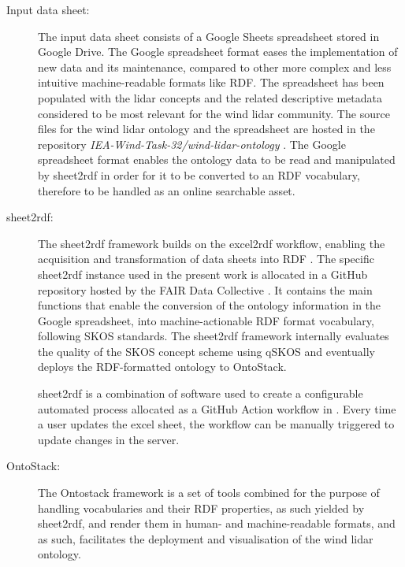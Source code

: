 \documentclass[remotesensing,article,submit,pdftex,moreauthors]{Definitions/mdpi}
\begin{document}
\begin{description}
    
    \item [Input data sheet:] The input data sheet consists of a Google Sheets spreadsheet stored in Google Drive. The Google spreadsheet format eases the implementation of new data and its maintenance, compared to other more complex and less intuitive machine-readable formats like RDF. The spreadsheet has been populated with the lidar concepts and the related descriptive metadata considered to be most relevant for the wind lidar community. The source files for the wind lidar ontology and the spreadsheet are hosted in the repository  \textit{IEA-Wind-Task-32/wind-lidar-ontology} \cite{ref-IEA-Wind-Task-32-wind-lidar-ontology}.
    The Google spreadsheet format enables the ontology data to be read and manipulated by sheet2rdf in order for it to be converted to an RDF vocabulary, therefore to be handled as an online searchable asset. 
    
    \item [sheet2rdf:] The sheet2rdf framework builds on the excel2rdf \cite{ref-excel2rdf} workflow, enabling the acquisition and transformation of data sheets into RDF \cite{ref-sheet2rdf}. The specific sheet2rdf instance used in the present work is allocated in a GitHub repository \cite{ref-FAIRsheet2rdf} hosted by the FAIR Data Collective \cite{}. It contains the main functions that enable the conversion of the ontology information in the Google spreadsheet, into machine-actionable RDF format vocabulary, following SKOS standards. The sheet2rdf framework internally evaluates the quality of the SKOS concept scheme using qSKOS \cite{ref-W3C-qSKOS} and eventually deploys the RDF-formatted ontology to OntoStack. 
    
    sheet2rdf is a combination of software used to create a configurable automated process allocated as a GitHub Action workflow in \cite{ref-FAIRsheet2rdf}. Every time a user updates the excel sheet, the workflow can be manually triggered to update changes in the server.
    
    \item [OntoStack:] The Ontostack framework is a set of tools combined for the purpose of handling vocabularies and their RDF properties, as such yielded by sheet2rdf, and render them in human- and machine-readable formats, and as such, facilitates the deployment and visualisation of the wind lidar ontology.
    

\end{description}
\end{document}
